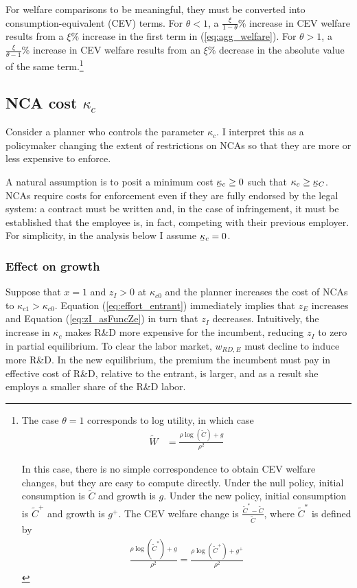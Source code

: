 \documentclass[11pt,english]{article}
\newcommand\munderbar[1]{%
	\underaccent{\bar}{#1}}
\theoremstyle{remark}
\begin{document}
For welfare comparisons to be meaningful, they must be converted into consumption-equivalent (CEV) terms. For $\theta < 1$, a $\frac{\xi}{1-\theta}\%$ increase in CEV welfare results from a $\xi\%$ increase in the first term in (\ref{eq:agg_welfare}). For $\theta > 1$, a $\frac{\xi}{\theta-1}\%$ increase in CEV welfare results from an $\xi\%$ decrease in the absolute value of the same term.\footnote{The case $\theta = 1$ corresponds to log utility, in which case
	\begin{align}
	\tilde{W} &= \frac{\rho \log(\tilde{C}) + g}{\rho^2} \label{eq:agg_welfare_log}
	\end{align}
	
	In this case, there is no simple correspondence to obtain CEV welfare changes, but they are easy to compute directly. Under the null policy, initial consumption is $\tilde{C}$ and growth is $g$. Under the new policy, initial consumption is $\tilde{C}^+$ and growth is $g^+$. The CEV welfare change is $\frac{\tilde{C}^* - \tilde{C}}{\tilde{C}}$, where $\tilde{C}^*$ is defined by 
	\begin{align}
	\frac{\rho\log(\tilde{C}^*) + g}{\rho^2} = \frac{\rho \log(\tilde{C}^+) + g^+}{\rho^2} \label{eq:agg_welfare_log_CEV}
	\end{align}}

\subsection{NCA cost $\kappa_c$} 

Consider a planner who controls the parameter $\kappa_c$. I interpret this as a policymaker changing the extent of restrictions on NCAs so that they are more or less expensive to enforce. 

A natural assumption is to posit a minimum cost $\munderbar{\kappa}_c \ge 0$ such that $\kappa_c \ge \munderbar{\kappa}_C$. NCAs require costs for enforcement even if they are fully endorsed by the legal system: a contract must be written and, in the case of infringement, it must be established that the employee is, in fact, competing with their previous employer. For simplicity, in the analysis below I assume $\munderbar{\kappa}_c = 0$.

\subsubsection{Effect on growth}

Suppose that $x = 1$ and $z_I > 0$ at $\kappa_{c0}$ and the planner increases the cost of NCAs to $\kappa_{c1} > \kappa_{c0}$. Equation (\ref{eq:effort_entrant}) immediately implies that $z_E$ increases and Equation (\ref{eq:zI_asFuncZe}) in turn that $z_I$ decreases. Intuitively, the increase in $\kappa_c$ makes R\&D more expensive for the incumbent, reducing $z_I$ to zero in partial equilibrium. To clear the labor market, $w_{RD,E}$ must decline to induce more R\&D. In the new equilibrium, the premium the incumbent must pay in effective cost of R\&D, relative to the entrant, is larger, and as a result she employs a smaller share of the R\&D labor.
\end{document}
